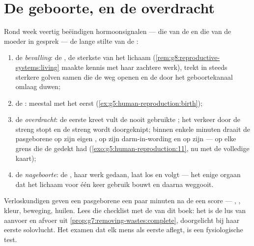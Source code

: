 \section{De geboorte, en de overdracht}

\begin{proposition}\label{prop:g8:from-egg-to-birth:birth}
Rond week veertig beëindigen hormoonsignalen --- die van de  en die
van de moeder in gesprek --- de lange stilte van de :
\begin{enumerate}
  \item de \emph{bevalling}: de , de sterkste  van het
        lichaam (\cref{rem:g8:reproductive-systems:living} maakte kennis
        met haar zachtere werk), trekt in steeds sterkere golven samen die
        de weg openen en de  door het geboortekanaal omlaag duwen;
  \item de \emph{}: meestal met het  eerst
        (\cref{ex:g5:human-reproduction:birth});
  \item de \emph{overdracht}: de eerste kreet vult de nooit gebruikte
        ; het verkeer door de streng stopt en de streng wordt
        doorgeknipt; binnen enkele minuten draait de pasgeborene op zijn
        eigen , op zijn darm-in-wording en op zijn  --- op
        elke grens die de  gedekt had
        (\cref{exo:g5:human-reproduction:11}, nu met de volledige kaart);
  \item de \emph{nageboorte}: de , haar werk gedaan, laat los en
        volgt --- het enige orgaan dat het lichaam voor één keer gebruik
        bouwt en daarna weggooit.
\end{enumerate}
\end{proposition}
\admitted

\begin{example}\label{ex:g8:from-egg-to-birth:audit}
Verloskundigen geven een pasgeborene een paar minuten na de  een
score --- , , kleur, beweging, huilen. Lees die
checklist met de  van dit boek: het is de lus van aanvoer en afvoer
uit \cref{prop:g7:removing-wastes:complete}, doorgelicht bij haar eerste
solovlucht. Het examen dat elk mens als eerste aflegt, is een
fysiologische test.
\end{example}

